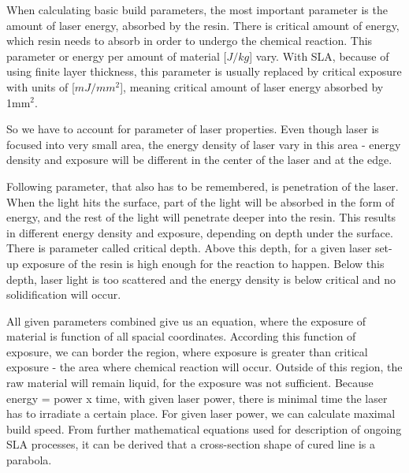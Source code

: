 \documentclass[a4paper, twoside, 11pt]{report}
\begin{document}
	When calculating basic build parameters, the most important parameter is the amount of laser energy, absorbed by the resin. There is critical amount of energy, which resin needs to absorb in order to undergo the chemical reaction. This parameter or energy per amount of material [$J/kg$] vary. With SLA, because of using finite layer thickness, this parameter is usually replaced by critical exposure with units of [$mJ/mm^2$], meaning critical amount of laser energy absorbed by 1mm$^2$.

	So we have to account for parameter of laser properties. Even though laser is focused into very small area, the energy density of laser vary in this area - energy density and exposure will be different in the center of the laser and at the edge.
	
	Following parameter, that also has to be remembered, is penetration of the laser. When the light hits the surface, part of the light will be absorbed in the form of energy, and the rest of the light will penetrate deeper into the resin. This results in different energy density and exposure, depending on depth under the surface. There is parameter called critical depth. Above this depth, for a given laser set-up exposure of the resin is high enough for the reaction to happen. Below this depth, laser light is too scattered and the energy density is below critical and no solidification will occur.


	All given parameters combined give us an equation, where the exposure of material is function of all spacial coordinates. According this function of exposure, we can border the region, where exposure is greater than critical exposure - the area where chemical reaction will occur. Outside of this region, the raw material will remain liquid, for the exposure was not sufficient. Because energy = power x time, with given laser power, there is minimal time the laser has to irradiate a certain place. For given laser power, we can calculate maximal build speed. From further mathematical equations used for description of ongoing SLA processes, it can be derived that a cross-section shape of cured line is a parabola.\\
%
\end{document}
